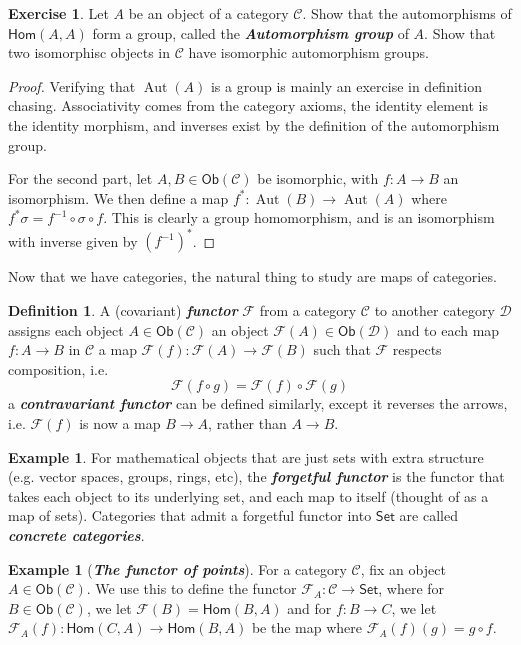 \documentclass[psamsfonts]{amsart}
\theoremstyle{definition}
\newtheorem{defn}[thm]{Definition}
\newtheorem{exmp}[thm]{Example}
\newtheorem{exer}[thm]{Exercise}
\theoremstyle{remark}
\renewcommand{\hom}{\mathsf{Hom}}
\newcommand{\ib}[1]{\textbf{\textit{#1}}}
\newcommand{\inv}{^{-1}}
\DeclareMathOperator{\Aut}{Aut}
\begin{document}
%
\begin{exer}
Let $A$ be an object of a category $\mathscr{C}$. Show that the automorphisms of $\hom(A,A)$ form a group, called the \ib{Automorphism group} of $A$. Show that two isomorphisc objects in $\mathscr{C}$ have isomorphic automorphism groups.
\end{exer}
%
\begin{proof}
Verifying that $\Aut(A)$ is a group is mainly an exercise in definition chasing. Associativity comes from the category axioms, the identity element is the identity morphism, and inverses exist by the definition of the automorphism group.

For the second part, let $A,B \in \mathsf{Ob}(\mathscr{C})$ be isomorphic, with $f: A \to B$ an isomorphism. We then define a map $f^*: \Aut(B) \to \Aut(A)$ where $f^*\sigma = f\inv \circ \sigma \circ f$. This is clearly a group homomorphism, and is an isomorphism with inverse given by $(f\inv)^*$.
\end{proof}
%
Now that we have categories, the natural thing to study are maps of categories.
%
\begin{defn}
A (covariant) \ib{functor} $\mathcal{F}$ from a category $\mathscr{C}$ to another category $\mathscr{D}$ assigns each object $A \in \mathsf{Ob}(\mathscr{C})$ an object $\mathcal{F}(A) \in \mathsf{Ob}(\mathscr{D})$ and to each map $f:A \to B$ in $\mathscr{C}$ a map $\mathcal{F}(f) : \mathcal{F}(A) \to \mathcal{F}(B)$ such that $\mathcal{F}$ respects composition, i.e.
$$\mathcal{F}(f \circ g) = \mathcal{F}(f) \circ \mathcal{F}(g) $$
a \ib{contravariant functor} can be defined similarly, except it reverses the arrows, i.e. $\mathcal{F}(f)$ is now a map $B \to A$, rather than $A \to B$.
\end{defn}
%
\begin{exmp}
For mathematical objects that are just sets with extra structure (e.g. vector spaces, groups, rings, etc), the \ib{forgetful functor} is the functor that takes each object to its underlying set, and each map to itself (thought of as a map of sets). Categories that admit a forgetful functor into $\mathsf{Set}$ are called \ib{concrete categories}.
\end{exmp}
%
\begin{exmp}[\ib{The functor of points}]
For a category $\mathscr{C}$, fix an object $A \in \mathsf{Ob}(\mathscr{C})$. We use this to define the functor $\mathcal{F}_A: \mathscr{C} \to \mathsf{Set}$, where for $B \in \mathsf{Ob}(\mathscr{C})$, we let $\mathcal{F}(B) = \hom(B,A)$ and for $f: B \to C$, we let $\mathcal{F}_A(f): \hom(C,A) \to \hom(B,A)$ be the map where $\mathcal{F}_A(f)(g) = g \circ f$.
\end{exmp}
\end{document}
